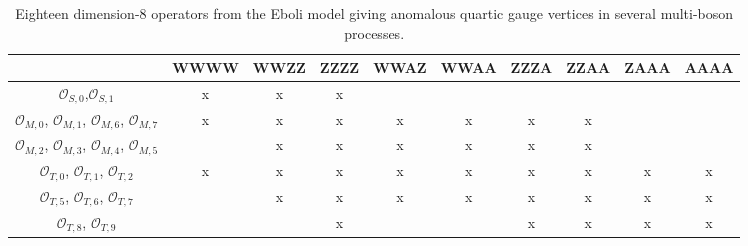 \begin{table}[!htbp]
    \caption{Eighteen dimension-8 operators from the Eboli model giving anomalous quartic gauge vertices in several multi-boson processes.\label{tab:aQGC_Operators}}
    \begin{center}
    \begin{tabular}{c|ccccccccc}
        \hline 
        & {\scriptsize{}WWWW} & {\scriptsize{}WWZZ} & {\scriptsize{}ZZZZ} & {\scriptsize{}WWAZ} & {\scriptsize{}WWAA} & {\scriptsize{}ZZZA} & {\scriptsize{}ZZAA} & {\scriptsize{}ZAAA} & {\scriptsize{}AAAA}\tabularnewline
        \hline
        \hline 
        {\footnotesize{}$\mathcal{O}_{S,0}$,$\mathcal{O}_{S,1}$} & {\scriptsize{}x} & {\scriptsize{}x} & {\scriptsize{}x} &  &  &  &  &  & \tabularnewline
        {\footnotesize{}$\mathcal{O}_{M,0}$, $\mathcal{O}_{M,1}$, $\mathcal{O}_{M,6}$, $\mathcal{O}_{M,7}$} & {\scriptsize{}x} & {\scriptsize{}x} & {\scriptsize{}x} & {\scriptsize{}x} & {\scriptsize{}x} & {\scriptsize{}x} & {\scriptsize{}x} &  & \tabularnewline
        {\footnotesize{}$\mathcal{O}_{M,2}$, $\mathcal{O}_{M,3}$, $\mathcal{O}_{M,4}$, $\mathcal{O}_{M,5}$} &  & {\scriptsize{}x} & {\scriptsize{}x} & {\scriptsize{}x} & {\scriptsize{}x} & {\scriptsize{}x} & {\scriptsize{}x} &  & \tabularnewline
        {\footnotesize{}$\mathcal{O}_{T,0}$, $\mathcal{O}_{T,1}$, $\mathcal{O}_{T,2}$} & {\scriptsize{}x} & {\scriptsize{}x} & {\scriptsize{}x} & {\scriptsize{}x} & {\scriptsize{}x} & {\scriptsize{}x} & {\scriptsize{}x} & {\scriptsize{}x} & {\scriptsize{}x}\tabularnewline
        {\footnotesize{}$\mathcal{O}_{T,5}$, $\mathcal{O}_{T,6}$, $\mathcal{O}_{T,7}$} &  & {\scriptsize{}x} & {\scriptsize{}x} & {\scriptsize{}x} & {\scriptsize{}x} & {\scriptsize{}x} & {\scriptsize{}x} & {\scriptsize{}x} & {\scriptsize{}x}\tabularnewline
        {\footnotesize{}$\mathcal{O}_{T,8}$, $\mathcal{O}_{T,9}$} &  &  & {\scriptsize{}x} &  &  & {\scriptsize{}x} & {\scriptsize{}x} & {\scriptsize{}x} & {\scriptsize{}x}\tabularnewline
        \hline
    \end{tabular}
    \end{center}
\end{table}

